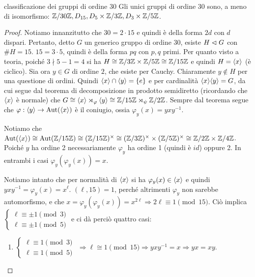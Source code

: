 \begin{example2}{classificazione dei gruppi di ordine 30}
    Gli unici gruppi di ordine $30$ sono, a meno di isomorfismo: $\mathbb{Z}/30\mathbb{Z}, D_{15}, D_5 \times \mathbb{Z}/3\mathbb{Z},  D_3 \times \mathbb{Z}/5\mathbb{Z}$.
\end{example2}
\begin{proof}
    Notiamo innanzitutto che $30 = 2\cdot15$ e quindi è della forma $2d$ con $d$ dispari. Pertanto, detto $G$ un generico gruppo di ordine 30, esiste $H \vartriangleleft G$ con $\#H = 15$. $15 = 3 \cdot 5$, quindi è della forma $pq$ con $p,q$ primi. Per quanto visto a teoria, poiché $3 \nmid 5-1 = 4$ si ha $H \cong \mathbb{Z}/3\mathbb{Z} \times \mathbb{Z}/5\mathbb{Z} \cong\mathbb{Z}/15\mathbb{Z}$ e quindi $H = \langle x \rangle$ (è ciclico). Sia ora $y \in G$ di ordine $2$, che esiste per Cauchy. Chiaramente $y \not \in H$ per una questione di ordini. Quindi $\langle x \rangle\cap\langle y \rangle = \left\{ e \right\}$ e per cardinalità $\langle x \rangle\langle y \rangle = G$, da cui segue dal teorema di decomposizione in prodotto semidiretto (ricordando che $\langle x \rangle$ è normale) che $G \cong \langle x \rangle \rtimes_{\varphi} \langle y \rangle \cong  \mathbb{Z}/15\mathbb{Z} \rtimes_{\psi} \mathbb{Z} /2\mathbb{Z}$. Sempre dal teorema segue che  $\varphi: \langle y \rangle \rightarrow \text{Aut}(\langle x \rangle)$ è il coniugio, ossia $\varphi_y(x) = yxy^{-1}$.
    
    Notiamo che $\text{Aut}(\langle x \rangle) \cong \text{Aut}(\mathbb{Z}/15\mathbb{Z}) \cong (\mathbb{Z}/15\mathbb{Z})^\times \cong (\mathbb{Z}/3\mathbb{Z})^\times \times (\mathbb{Z}/5\mathbb{Z})^\times \cong \mathbb{Z}/2\mathbb{Z} \times \mathbb{Z}/4\mathbb{Z}$. Poiché $y$ ha ordine 2 necessariamente $\varphi_y$ ha ordine 1 (quindi è $id$) oppure 2. In entrambi i casi $\varphi_y(\varphi_y(x)) = x$.
    
    Notiamo intanto che per normalità di $\langle x \rangle$ si ha $\varphi_y(x) \in \langle x \rangle$ e quindi $yxy^{-1} = \varphi_y(x) = x^{\ell}$.
    $(\ell,15) = 1$, perché altrimenti $\varphi_y$ non sarebbe automorfismo, e che $x = \varphi_y(\varphi_y(x)) = x^{2\ell} \Rightarrow 2 \ell \equiv 1 \pmod{15}$. Ciò implica
    $\begin{cases}
    \ell \equiv \pm 1 \pmod{3} \\
    \ell \equiv \pm 1 \pmod{5} 
    \end{cases}$
    e ci dà perciò quattro casi: 
    \begin{enumerate}
        \item
        $\begin{cases}
        \ell \equiv  1 \pmod{3} \\
        \ell \equiv  1 \pmod{5} 
        \end{cases}$ $\Rightarrow \ell \cong 1 \pmod{15} \Rightarrow yxy^{-1} = x \Rightarrow yx = xy$.
        

\end{enumerate}
\end{proof}
